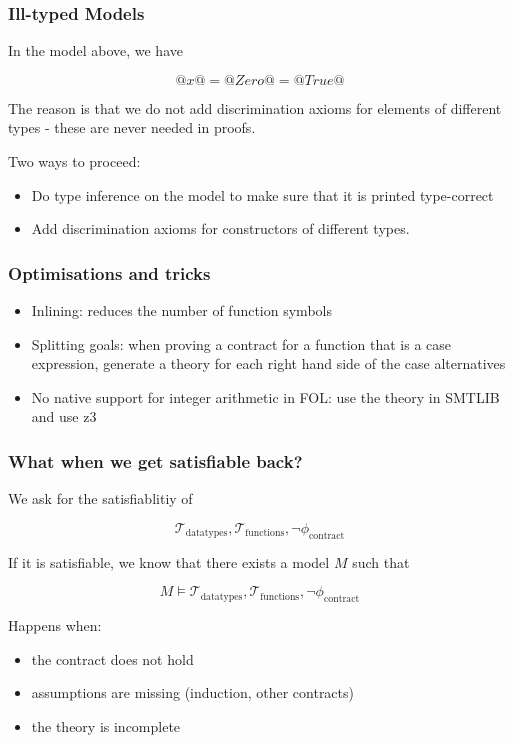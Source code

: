 \documentclass[serif,professionalfont]{beamer}
\begin{document}
\begin{frame}
  \frametitle{Ill-typed Models}
    In the model above, we have

    $$@x@ = @Zero@ = @True@$$

    The reason is that we do not add discrimination axioms for
    elements of different types - these are never needed in proofs.

    Two ways to proceed:

    \begin{itemize}

      \item Do type inference on the model to make sure that it is
        printed type-correct

      \item Add discrimination axioms for constructors of different
        types.

    \end{itemize}
\end{frame}

\begin{frame}[fragile]
  \frametitle{Optimisations and tricks}

    \begin{itemize}

      \item Inlining: reduces the number of function symbols

      \item Splitting goals: when proving a contract for a function
        that is a case expression, generate a theory for each right
        hand side of the case alternatives

      \item No native support for integer arithmetic in FOL: use
        the theory in SMTLIB and use z3
    \end{itemize}

\end{frame}

\begin{frame}[fragile]
  \frametitle{What when we get satisfiable back?}

  We ask for the satisfiablitiy of

  $$
    \mathcal{T}_{\text{datatypes}}, \mathcal{T}_{\text{functions}} ,
    \neg \phi_{\text{contract}}
  $$

  If it is satisfiable, we know that there exists a model $M$ such that

  $$
    M \models
    \mathcal{T}_{\text{datatypes}},
    \mathcal{T}_{\text{functions}} ,
    \neg \phi_{\text{contract}}
  $$

  Happens when:
    \begin{itemize}
      \item the contract does not hold

      \item assumptions are missing (induction, other contracts)

      \item the theory is incomplete
    \end{itemize}

\end{frame}
\end{document}
